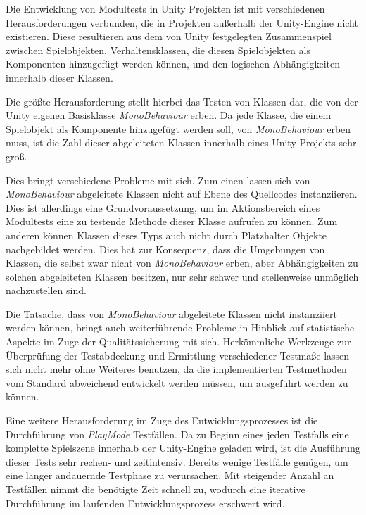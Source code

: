 Die Entwicklung von Modultests in Unity Projekten ist mit verschiedenen Herausforderungen verbunden, die in Projekten außerhalb der Unity-Engine nicht existieren. Diese resultieren aus dem von Unity festgelegten Zusammenspiel zwischen Spielobjekten, Verhaltensklassen, die diesen Spielobjekten als Komponenten hinzugefügt werden können, und den logischen Abhängigkeiten innerhalb dieser Klassen.

Die größte Herausforderung stellt hierbei das Testen von Klassen dar, die von der Unity eigenen Basisklasse \textit{MonoBehaviour} erben. Da jede Klasse, die einem Spielobjekt als Komponente hinzugefügt werden soll, von \textit{MonoBehaviour} erben muss, ist die Zahl dieser abgeleiteten Klassen innerhalb eines Unity Projekts sehr groß. 

Dies bringt verschiedene Probleme mit sich. Zum einen lassen sich von \textit{MonoBehaviour} abgeleitete Klassen nicht auf Ebene des Quellcodes instanziieren. Dies ist allerdings eine Grundvoraussetzung, um im Aktionsbereich eines Modultests eine zu testende Methode dieser Klasse aufrufen zu können. Zum anderen können Klassen dieses Typs auch nicht durch Platzhalter Objekte nachgebildet werden. Dies hat zur Konsequenz, dass die Umgebungen von Klassen, die selbst zwar nicht von \textit{MonoBehaviour} erben, aber Abhängigkeiten zu solchen abgeleiteten Klassen besitzen, nur sehr schwer und stellenweise unmöglich nachzustellen sind.

Die Tatsache, dass von \textit{MonoBehaviour} abgeleitete Klassen nicht instanziiert werden können, bringt auch weiterführende Probleme in Hinblick auf statistische Aspekte im Zuge der Qualitätssicherung mit sich. Herkömmliche Werkzeuge zur Überprüfung der Testabdeckung und Ermittlung verschiedener Testmaße lassen sich nicht mehr ohne Weiteres benutzen, da die implementierten Testmethoden vom Standard abweichend entwickelt werden müssen, um ausgeführt werden zu können. 

Eine weitere Herausforderung im Zuge des Entwicklungsprozesses ist die Durchführung von \textit{PlayMode} Testfällen. Da zu Beginn eines jeden Testfalls eine komplette Spielszene innerhalb der Unity-Engine geladen wird, ist die Ausführung dieser Tests sehr rechen- und zeitintensiv. Bereits wenige Testfälle genügen, um eine länger andauernde Testphase zu verursachen. Mit steigender Anzahl an Testfällen nimmt die benötigte Zeit schnell zu, wodurch eine iterative Durchführung im laufenden Entwicklungsprozess erschwert wird. 

%
%
%

